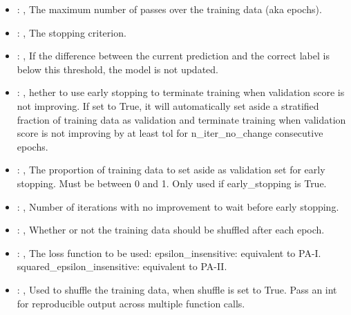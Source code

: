 \begin{itemize}
    \item {}: ,
      The maximum number of passes over the training data (aka epochs).

    \item {}: ,
      The stopping criterion.

    \item {}: ,
      If the difference between the current prediction and the
      correct label is below this threshold, the model is not updated.

    \item {}: ,
      hether to use early stopping to terminate training when validation score is not
      improving. If set to True, it will automatically set aside a stratified fraction of training
      data as validation and terminate training when validation score is not improving by at least
      tol for n\_iter\_no\_change consecutive epochs.

    \item {}: ,
      The proportion of training data to set aside as validation set for early stopping.
      Must be between 0 and 1. Only used if early\_stopping is True.

    \item {}: ,
      Number of iterations with no improvement to wait before early stopping.

    \item {}: ,
      Whether or not the training data should be shuffled after each epoch.

    \item {}: ,
      The loss function to be used: epsilon\_insensitive: equivalent to PA-I.
      squared\_epsilon\_insensitive: equivalent to PA-II.

    \item {}: ,
      Used to shuffle the training data, when shuffle is set to
      True. Pass an int for reproducible output across multiple function calls.


\end{itemize}

